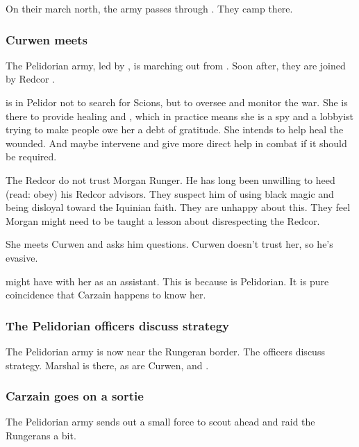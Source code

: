 On their march north, the army passes through \Forclin. They camp there. 





\subsubsection{Curwen meets \Esmerel}
The Pelidorian army, led by , is marching out from \Malcur. Soon after, they are joined by Redcor \Matron{} \Esmerel. 

\Esmerel{} is in Pelidor not to search for Scions, but to oversee and monitor the war. 
She is there to provide healing and , which in practice means she is a spy and a lobbyist trying to make people owe her a debt of gratitude. 
She intends to help heal the wounded. 
And maybe intervene and give more direct help in combat if it should be required. 

The Redcor do not trust Morgan Runger. 
He has long been unwilling to heed (read: obey) his Redcor advisors. 
They suspect him of using black magic and being disloyal toward the Iquinian faith. 
They are unhappy about this. 
They feel Morgan might need to be taught a lesson about disrespecting the Redcor. 

She meets Curwen and asks him questions. 
Curwen doesn't trust her, so he's evasive. 

\Esmerel{} might have \Racel{} with her as an assistant. 
This is because \Racel{} is Pelidorian.
It is pure coincidence that Carzain happens to know her. 





\subsubsection{The Pelidorian officers discuss strategy}
The Pelidorian army is now near the Rungeran border. 
The officers discuss strategy. 
Marshal  is there, as are Curwen, \Sanyor{} and \Dornaer. 





\subsubsection{Carzain goes on a sortie}
The Pelidorian army sends out a small force to scout ahead and raid the Rungerans a bit. 

